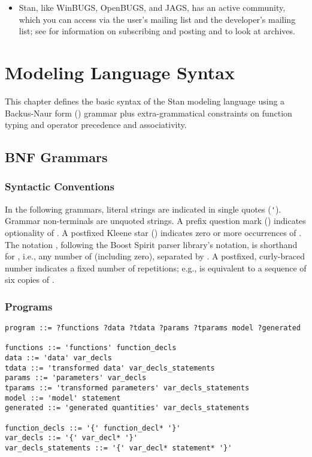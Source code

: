 \begin{itemize}
\item Stan, like WinBUGS, OpenBUGS, and JAGS, has an active community,
  which you can access via the user's mailing list and the developer's
  mailing list; see  for information on
  subscribing and posting and to look at archives.
\end{itemize}

\chapter{Modeling Language Syntax}

\noindent
This chapter defines the basic syntax of the Stan modeling language
using a Backus-Naur form (\BNF) grammar plus extra-grammatical
constraints on function typing and operator precedence and
associativity.

\section{BNF Grammars}

\subsection{Syntactic Conventions}

In the following \BNF grammars, literal strings are indicated in
single quotes (\Verb|'|).  Grammar non-terminals are unquoted strings.
A prefix question mark () indicates optionality of .
A postfixed Kleene star () indicates zero or more occurrences
of .  The notation , following the Boost Spirit
parser library's notation, is shorthand for , i.e.,
any number of  (including zero), separated by .  A
postfixed, curly-braced number indicates a fixed number of repetitions;
e.g.,  is equivalent to a sequence of six copies of .

\subsection{Programs}

{\small
\begin{Verbatim}
program ::= ?functions ?data ?tdata ?params ?tparams model ?generated

functions ::= 'functions' function_decls
data ::= 'data' var_decls
tdata ::= 'transformed data' var_decls_statements
params ::= 'parameters' var_decls
tparams ::= 'transformed parameters' var_decls_statements
model ::= 'model' statement
generated ::= 'generated quantities' var_decls_statements

function_decls ::= '{' function_decl* '}'
var_decls ::= '{' var_decl* '}'
var_decls_statements ::= '{' var_decl* statement* '}'
\end{Verbatim}
}

